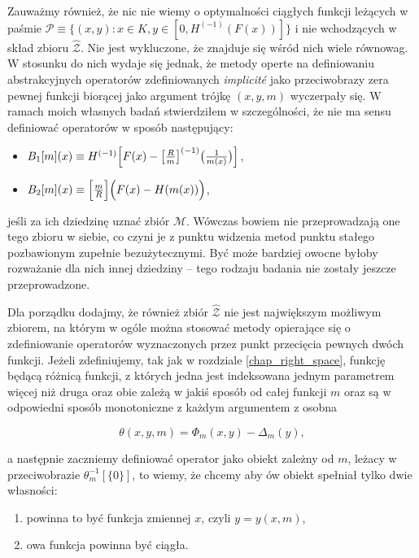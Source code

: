 Zauważmy również, że nic nie wiemy o optymalności ciągłych funkcji leżących w paśmie $\mathcal{P} \equiv \{ (x,y): x \in K, y \in [0,H^{(-1)}(F(x))]\}$ i nie wchodzących w skład zbioru $\hat{\mathcal{Z}}$. Nie jest wykluczone, że znajduje się wśród nich wiele równowag. W stosunku do nich wydaje się jednak, że metody operte na definiowaniu abstrakcyjnych operatorów zdefiniowanych {\it implicit\' e} jako przeciwobrazy zera pewnej funkcji biorącej jako argument trójkę $(x,y,m)$ wyczerpały się. W ramach moich własnych badań stwierdziłem w szczególności, że nie ma sensu definiować operatorów w sposób następujący:

\begin{itemize}
	\item{$B_1[m](x) \equiv H^{(-1)}\Bigl[ F(x) - \bigl[ \frac{R}{m} \big]^{(-1)} \bigl( \frac{1}{m(x)}\bigl)  \Bigl]$,}
	\item{$B_2[m](x) \equiv \Bigl[\frac{m}{R}\Bigl] \Bigl( F(x) - H(m(x)) \Bigl)$,}
\end{itemize}  

jeśli za ich dziedzinę uznać zbiór $\mathcal{M}$. Wówczas bowiem nie przeprowadzają one tego zbioru w siebie, co czyni je z punktu widzenia metod punktu stałego pozbawionym zupełnie bezużytecznymi. Być może bardziej owocne byłoby rozważanie dla nich innej dziedziny  -- tego rodzaju badania nie zostały jeszcze przeprowadzone.	 

Dla porządku dodajmy, że również zbiór $\hat{\mathcal{Z}}$ nie jest największym możliwym zbiorem, na którym w ogóle można stosować metody opierające się o zdefiniowanie operatorów wyznaczonych przez punkt przecięcia pewnych dwóch funkcji. Jeżeli zdefiniujemy, tak jak w rozdziale \ref{chap_right_space}, funkcję będącą różnicą funkcji, z których jedna jest indeksowana jednym parametrem więcej niż druga oraz obie zależą w jakiś sposób od całej funkcji $m$ oraz są w odpowiedni sposób monotoniczne z każdym argumentem z osobna

\begin{equation*}
\theta(x,y,m) = \Phi_m(x,y) - \Delta_m(y),
\end{equation*}

a następnie zaczniemy definiować operator jako obiekt zależny od $m$, leżacy w przeciwobrazie $\theta_m^{-1}[\{ 0\}]$, to wiemy, że chcemy aby ów obiekt spełniał tylko dwie własności:

\begin{enumerate}
	\item{powinna to być funkcja zmiennej $x$, czyli $y = y(x,m)$},
	\item{owa funkcja powinna być ciągła}.
\end{enumerate}

